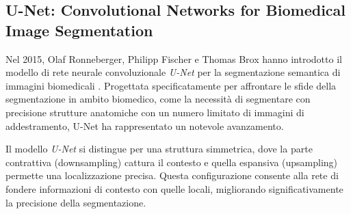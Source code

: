 %
%
%
%


\subsection{U-Net: Convolutional Networks for Biomedical Image Segmentation}

Nel 2015, Olaf Ronneberger, Philipp Fischer e Thomas Brox hanno introdotto il modello di rete
neurale convoluzionale \textit{U-Net} per la segmentazione semantica di immagini biomedicali
\cite{ronneberger2015unet}. Progettata specificatamente per affrontare le sfide della segmentazione
in ambito biomedico, come la necessità di segmentare con precisione strutture anatomiche con un
numero limitato di immagini di addestramento, U-Net ha rappresentato un notevole avanzamento.

Il modello \textit{U-Net} si distingue per una struttura simmetrica, dove la parte contrattiva
(downsampling) cattura il contesto e quella espansiva (upsampling) permette una localizzazione
precisa. Questa configurazione consente alla rete di fondere informazioni di contesto con quelle
locali, migliorando significativamente la precisione della segmentazione.

